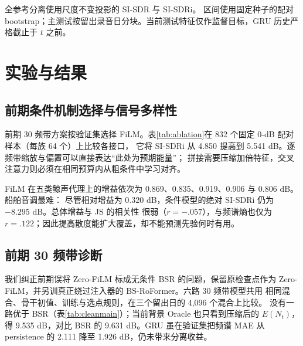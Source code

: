 \documentclass[conference]{IEEEtran}
\begin{document}
全参考分离使用尺度不变投影的 SI-SDR 与 SI-SDRi\cite{vincent2006sdr,leroux2019sdr}。
区间使用固定种子的配对 bootstrap；主测试按留出录音日分块。当前测试特征仅作监督目标，GRU 历史严格截止于 $t$ 之前。

\section{实验与结果}
\subsection{前期条件机制选择与信号多样性}
前期 30 频带方案按验证集选择 FiLM。表\ref{tab:ablation}在 832 个固定 0-dB 配对样本（每族 64 个）上比较各接口，
它将 SI-SDRi 从 4.850 提高到 5.541 dB。逐频带缩放与偏置可以直接表达“此处为预期能量”；
拼接需要压缩加倍特征，交叉注意力则必须在相同预算内从粗条件中学习对齐。

\begin{table}[t]
\caption{匹配的 5 秒条件注入消融（dB）。}
\label{tab:ablation}\centering\footnotesize
{}%
\end{table}

FiLM 在五类鲸声代理上的增益依次为 0.869、0.835、0.919、0.906 与 0.806 dB。船舶音调最难：
尽管相对增益为 0.320 dB，条件模型的绝对 SI-SDRi 仍为 $-8.295$ dB。总体增益与 JS 的相关性
很弱（$r=-.057$），与频谱熵也仅为 $r=.122$；因此提高散度能扩大覆盖，却不能预测先验何时有用。

\subsection{前期 30 频带诊断}
我们纠正前期误将 Zero-FiLM 标成无条件 BSR 的问题，保留原检查点作为
Zero-FiLM，并另训真正绕过注入器的 BS-RoFormer。六路 30 频带模型共用
相同混合、骨干初值、训练与选点规则，在三个留出日的 4,096 个混合上比较。
没有一路优于 BSR（表\ref{tab:cleanmain}）；当前背景 Oracle 也只看到压缩后的
$E(N_t)$，得 9.535 dB，对比 BSR 的 9.631 dB。GRU 虽在验证集把频谱
MAE 从 persistence 的 2.111 降至 1.926 dB，仍未带来分离收益。
\end{document}
